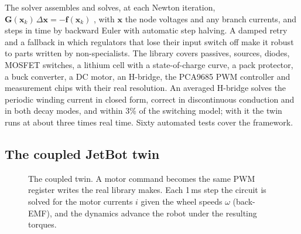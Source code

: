 \documentclass[conference,a4paper]{IEEEtran}
\newcommand{\code}[1]{\texttt{\small #1}}
\begin{document}
The solver assembles and solves, at each Newton iteration,
$\mathbf{G}(\mathbf{x}_k)\,\Delta\mathbf{x} = -\mathbf{f}(\mathbf{x}_k)$
\citep{ho1975modified}, with $\mathbf{x}$ the node voltages and any branch
currents, and steps in time by backward Euler with automatic step halving. A
damped retry and a fallback in which regulators that lose their input switch
off make it robust to parts written by non-specialists. The library covers
passives, sources, diodes, MOSFET switches, a lithium cell with a
state-of-charge curve, a pack protector, a buck converter, a DC motor, an
H-bridge, the PCA9685 PWM controller and measurement chips with their real
resolution. An averaged H-bridge solves the periodic winding current in closed
form, correct in discontinuous conduction and in both decay modes, and within
3\% of the switching model; with it the twin runs at about three times real
time. Sixty automated tests cover the framework.

\subsection{The coupled JetBot twin}
\begin{figure}[t]
\centering
{}
\caption{The coupled twin. A motor command becomes the same PWM register
writes the real library makes. Each 1\,ms step the circuit is solved for the
motor currents $i$ given the wheel speeds $\omega$ (back-EMF), and the
dynamics advance the robot under the resulting torques.}
\label{fig:arch}
\end{figure}
\end{document}

